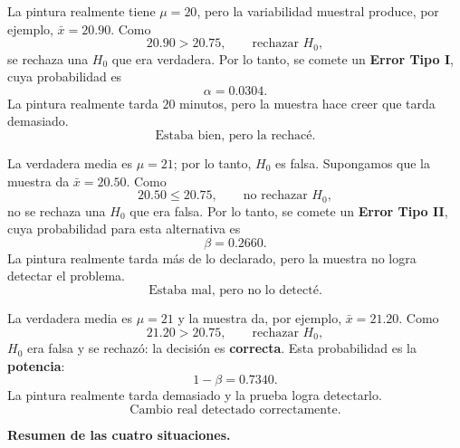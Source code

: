 \documentclass[11pt,a4paper]{article}
\begin{document}
\begin{tcolorbox}[
  colback=rejectred!5,colframe=rejectred!75!black,
  title=\textbf{Situación 2 -- Error Tipo I},
  fonttitle=\bfseries,arc=2mm,boxrule=.8pt]
La pintura realmente tiene $\mu=20$, pero la variabilidad muestral produce, por ejemplo, $\bar{x}=20.90$. Como
\[
20.90>20.75,
\qquad
\boxed{\text{rechazar }H_0},
\]
se rechaza una $H_0$ que era verdadera. Por lo tanto, se comete un \textbf{Error Tipo I}, cuya probabilidad es
\[
\alpha=0.0304.
\]
La pintura realmente tarda $20$ minutos, pero la muestra hace creer que tarda demasiado.
\[
\boxed{\text{Estaba bien, pero la rechacé.}}
\]
\end{tcolorbox}

\begin{tcolorbox}[
  colback=altorange!6,colframe=altorange!85!black,
  title=\textbf{Situación 3 -- Error Tipo II},
  fonttitle=\bfseries,arc=2mm,boxrule=.8pt]
La verdadera media es $\mu=21$; por lo tanto, $H_0$ es falsa. Supongamos que la muestra da $\bar{x}=20.50$. Como
\[
20.50\le20.75,
\qquad
\boxed{\text{no rechazar }H_0},
\]
no se rechaza una $H_0$ que era falsa. Por lo tanto, se comete un \textbf{Error Tipo II}, cuya probabilidad para esta alternativa es
\[
\beta=0.2660.
\]
La pintura realmente tarda más de lo declarado, pero la muestra no logra detectar el problema.
\[
\boxed{\text{Estaba mal, pero no lo detecté.}}
\]
\end{tcolorbox}

\begin{tcolorbox}[
  colback=accentgreen!6,colframe=accentgreen!75!black,
  title=\textbf{Situación 4 -- $H_0$ falsa y se rechaza},
  fonttitle=\bfseries,arc=2mm,boxrule=.8pt]
La verdadera media es $\mu=21$ y la muestra da, por ejemplo, $\bar{x}=21.20$. Como
\[
21.20>20.75,
\qquad
\boxed{\text{rechazar }H_0},
\]
$H_0$ era falsa y se rechazó: la decisión es \textbf{correcta}. Esta probabilidad es la \textbf{potencia}:
\[
1-\beta=0.7340.
\]
La pintura realmente tarda demasiado y la prueba logra detectarlo.
\[
\boxed{\text{Cambio real detectado correctamente.}}
\]
\end{tcolorbox}

\medskip\noindent\textbf{Resumen de las cuatro situaciones.}\par\smallskip
\end{document}
